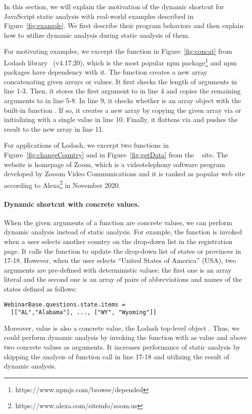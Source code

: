 In this section, we will explain the motivation of the dynamic shortcut for
JavaScript static analysis with real-world examples described in
Figure~\ref{fig:example}.  We first describe their program behaviors and then
explain how to utilize dynamic analysis during static analysis of them.

For motivating examples, we excerpt the  function in
Figure~\ref{fig:concat} from Lodash library~\cite{lodash} (v4.17.20), which is
the most popular npm package\footnote{https://www.npmjs.com/browse/depended}
and  npm packages have dependency with it.  The 
function creates a new array concatenating given arrays or values.  It first
checks the length of arguments in line 1-3. Then, it stores the first argument
to  in line 4 and copies the remaining arguments to  in
line 5-8.  In line 9, it checks whether  is an array object with
the built-in function .  If so, it creates a new array by
copying the given array via or initializing with a single value in line 10.
Finally, it flattens  via  and pushes the
result to the new array in line 11.

For applications of Lodash, we excerpt two functions  in
Figure~\ref{fig:changeCountry} and  in Figure~\ref{fig:getData}
from the ~\cite{zoom} site.  The website  is
homepage of Zoom, which is a videotelephony software program developed by Zooom
Video Communications and it is ranked as  popular web site according
to Alexa\footnote{https://www.alexa.com/siteinfo/zoom.us} in November 2020.


\paragraph{Dynamic shortcut with concrete values.}
When the given arguments of a function are concrete values, we can perform
dynamic analysis instead of static analysis. For example, the
 function is invoked when a user selects another country
on the drop-down list in the registration page.  It calls the 
function to update the drop-down list of states or provinces in 17-18.  However,
when the user selects ``United States of America'' (USA), two arguments are
pre-defined with deterministic values; the first one is an array literal
 and the second one is an array of pairs of
abbreviations and names of the states defined as follows:
\begin{lstlisting}[style=myJSstyle,numbers=none]
WebinarBase.questions.state.items =
  [["AL","Alabama"], ..., ["WY", "Wyoming"]]
\end{lstlisting}
Moreover,  value is also a concrete value, the Lodash top-level
object \jscode{\_}.  Thus, we could perform dynamic analysis by invoking the
 function with \jscode{\_} as  value and above two
concrete values as arguments.  It increases performance of static analysis by
skipping the analysis of function call in line 17-18 and utilizing the result of
dynamic analysis.

